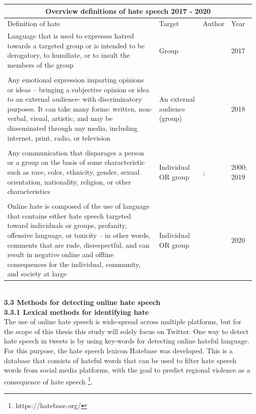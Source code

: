 \documentclass[a4paper,pdf]{article}
\begin{document}
\begin{tabular}{ |p{7cm}||p{3cm}|p{3cm}|p{1cm}| }
 \hline
 \multicolumn{4}{|c|}{Overview definitions of hate speech 2017 - 2020} \\
 \hline
 Definition of hate &Target & Author & Year \\
 \hline
 Language that is used to expresses hatred towards a targeted group or is intended to be derogatory, to humiliate,
or to insult the members of the group & Group    &\citet{Davidson2017AutomatedLanguage} & 2017  \\
           &     &   & \\
 Any emotional expression imparting opinions or
ideas – bringing a subjective opinion or idea to an
external audience- with discriminatory purposes. It
can take many forms: written, non-verbal, visual,
artistic, and may be disseminated through any media,
including internet, print, radio, or television &An external audience (group) & \citet{Martins2018HateAnalysis} & 2018\\
     & & &\\
Any communication that disparages a person or a group
on the basis of some characteristic such as race,
color, ethnicity, gender, sexual orientation, nationality, religion, or other characteristics&   Individual OR group  & \citet{Nockleby2000HATESPEECH}; \citet{Bauwelinck2019LT3hatEval} &2000; 2019\\
    & & & \\
 Online hate is composed of the use of language that contains either hate speech targeted toward individuals or groups, profanity, offensive language, or toxicity –
in other words, comments that are rude, disrespectful, and can result in negative online and offline consequences for the individual, community, and society at large & Individual OR group  & \citet{Salminen2020DevelopingPlatforms} &2020\\
 \hline
\end{tabular}\\
\break{} 
\textbf{3.3 Methods for detecting online hate speech}\\
\break{}
\textbf{3.3.1 Lexical methods for identifying hate}\\
\break{}
The use of online hate speech is wide-spread across multiple platforms, but for the scope of this thesis this study will solely focus on Twitter. One way to detect hate speech in tweets is by using key-words for detecting online hateful language. For this purpose, the hate speech lexicon Hatebase was developed. This is a database that consists of hateful words that can be used to filter hate speech words from social media platforms, with the goal to predict regional violence as a consequence of hate speech \footnote{https://hatebase.org/}. \\
\end{document}
